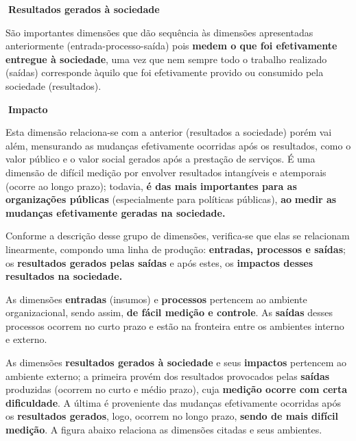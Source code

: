 \documentclass[
  letterpaper,
  DIV=11,
  numbers=noendperiod]{scrreprt}
\begin{document}
\begin{tcolorbox}[enhanced jigsaw, bottomrule=.15mm, arc=.35mm, breakable, toprule=.15mm, rightrule=.15mm, opacityback=0, left=2mm, colback=white, leftrule=.75mm]

\textbf{🔽{Resultados gerados à sociedade}}\vspace{2mm}

São importantes dimensões que dão sequência às dimensões apresentadas
anteriormente (entrada-processo-saída) pois \textbf{medem o que foi
efetivamente entregue à sociedade}, uma vez que nem sempre todo o
trabalho realizado (saídas) corresponde àquilo que foi efetivamente
provido ou consumido pela sociedade (resultados).

\end{tcolorbox}

\begin{tcolorbox}[enhanced jigsaw, bottomrule=.15mm, arc=.35mm, breakable, toprule=.15mm, rightrule=.15mm, opacityback=0, left=2mm, colback=white, leftrule=.75mm]

\textbf{🔽{Impacto}}\vspace{2mm}

Esta dimensão relaciona-se com a anterior (resultados a sociedade) porém
vai além, mensurando as mudanças efetivamente ocorridas após os
resultados, como o valor público e o valor social gerados após a
prestação de serviços. É uma dimensão de difícil medição por envolver
resultados intangíveis e atemporais (ocorre ao longo prazo); todavia,
\textbf{é das mais importantes para as organizações públicas}
(especialmente para políticas públicas), \textbf{ao} \textbf{medir as
mudanças efetivamente geradas na sociedade.}

\end{tcolorbox}

Conforme a descrição desse grupo de dimensões, verifica-se que elas se
relacionam linearmente, compondo uma linha de produção:
\textbf{entradas, processos e saídas}; os \textbf{resultados gerados
pelas saídas} e após estes, os \textbf{impactos desses resultados na
sociedade.}

As dimensões \textbf{entradas} (insumos) e \textbf{processos} pertencem
ao ambiente organizacional, sendo assim, \textbf{de fácil medição e
controle}. As \textbf{saídas} desses processos ocorrem no curto prazo e
estão na fronteira entre os ambientes interno e externo.

As dimensões \textbf{resultados gerados à sociedade} e seus
\textbf{impactos} pertencem ao ambiente externo; a primeira provém dos
resultados provocados pelas \textbf{saídas} produzidas (ocorrem no curto
e médio prazo), cuja \textbf{medição ocorre com certa dificuldade}. A
última é proveniente das mudanças efetivamente ocorridas após os
\textbf{resultados gerados}, logo, ocorrem no longo prazo, \textbf{sendo
de mais difícil medição}. A figura abaixo relaciona as dimensões citadas
e seus ambientes.
\end{document}
